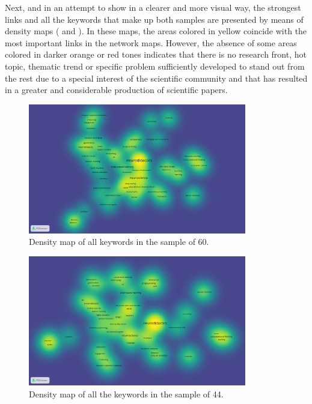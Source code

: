 \documentclass[english]{textolivre}
\begin{document}
Next, and in an attempt to show in a clearer and more visual way, the strongest links and all the keywords that make up both samples are presented by means of density maps ( and ). In these maps, the areas colored in yellow coincide with the most important links in the network maps. However, the absence of some areas colored in darker orange or red tones indicates that there is no research front, hot topic, thematic trend or specific problem sufficiently developed to stand out from the rest due to a special interest of the scientific community and that has resulted in a greater and considerable production of scientific papers.

\begin{figure}[htbp]
 \centering
 \includegraphics[width=0.85\textwidth]{Fig4.png}
 \caption{Density map of all keywords in the sample of 60.}
 \label{fig04}
\end{figure}

\begin{figure}[htbp]
 \centering
 \includegraphics[width=0.85\textwidth]{Fig5.png}
 \caption{Density map of all the keywords in the sample of 44.}
 \label{fig05}
\end{figure}
\end{document}
